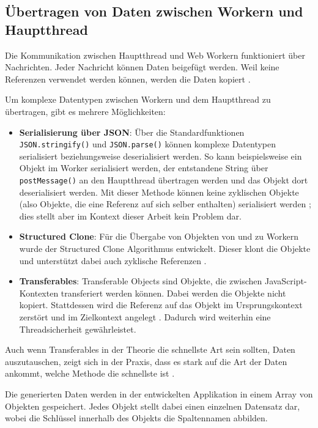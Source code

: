 \subsection{Übertragen von Daten zwischen Workern und Hauptthread}

Die Kommunikation zwischen Hauptthread und Web Workern funktioniert über Nachrichten. Jeder Nachricht können Daten beigefügt werden. Weil keine Referenzen verwendet werden können, werden die Daten kopiert \cite{mdn:webworkers}.

Um komplexe Datentypen zwischen Workern und dem Hauptthread zu übertragen, gibt es mehrere Möglichkeiten:
\begin{itemize}
    \item \textbf{Serialisierung über JSON}: Über die Standardfunktionen \texttt{JSON.stringify()} und \texttt{JSON.parse()} können komplexe Datentypen serialisiert beziehungsweise deserialisiert werden. So kann beispielsweise ein Objekt im Worker serialisiert werden, der entstandene String über \texttt{postMessage()} an den Hauptthread übertragen werden und das Objekt dort deserialisiert werden. Mit dieser Methode können keine zyklischen Objekte (also Objekte, die eine Referenz auf sich selber enthalten) serialisiert werden \cite{mdn:json_stringify}; dies stellt aber im Kontext dieser Arbeit kein Problem dar.
    \item \textbf{Structured Clone}: Für die Übergabe von Objekten von und zu Workern wurde der Structured Clone Algorithmus entwickelt. Dieser klont die Objekte und unterstützt dabei auch zyklische Referenzen \cite{mdn:structured_cloning}.
    \item \textbf{Transferables}: Transferable Objects sind Objekte, die zwischen JavaScript-Kon\-texten transferiert werden können. Dabei werden die Objekte nicht kopiert. Stattdessen wird die Referenz auf das Objekt im Ursprungskontext zerstört und im Zielkontext angelegt \cite{googledev:transferables}. Dadurch wird weiterhin eine Threadsicherheit gewährleistet.
\end{itemize}

Auch wenn Transferables in der Theorie die schnellste Art sein sollten, Daten auszutauschen, zeigt sich in der Praxis, dass es stark auf die Art der Daten ankommt, welche Methode die schnellste ist \cite{transferables1, transferables2, transferables3}.

Die generierten Daten werden in der entwickelten Applikation in einem Array von Objekten gespeichert. Jedes Objekt stellt dabei einen einzelnen Datensatz dar, wobei die Schlüssel innerhalb des Objekts die Spaltennamen abbilden.

